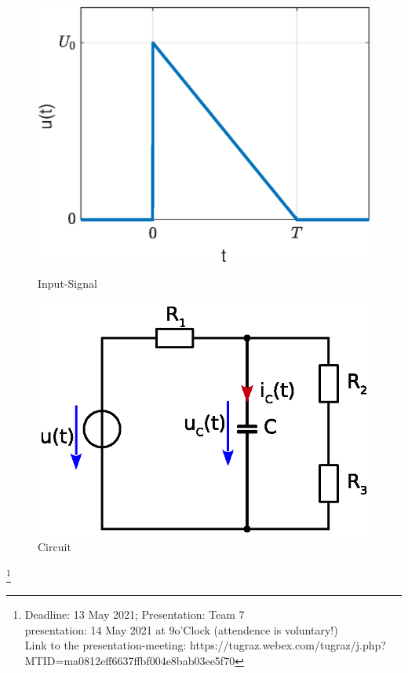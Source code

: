 \documentclass[a4paper]{article}
\newcommand\blfootnote[1]{%
	\begingroup
	\renewcommand\thefootnote{}\footnote{#1}%
	\addtocounter{footnote}{-1}%
	\endgroup
}
\begin{document}
	\begin{figure}[!htb]
		\begin{minipage}{0.4\textwidth}
			\includegraphics[width=1\textwidth]{./Figures/input-signal.eps}
			\caption{Input-Signal}
			\label{fig:input}
		\end{minipage}\hfill
		\begin{minipage}{0.4\textwidth}
			\includegraphics[width=1\textwidth]{./Figures/homework7_circuit.eps}
			\caption{Circuit}
			\label{fig:circuit}
			\vspace{1cm}
		\end{minipage}
	\end{figure}
	
	
	\blfootnote{Deadline: 13 May 2021; Presentation: Team 7 \\
		presentation: 14 May 2021 at 9o'Clock (attendence is voluntary!) \\
	Link to the presentation-meeting: https://tugraz.webex.com/tugraz/j.php?MTID=ma0812eff6637ffbf004e8bab03ee5f70}
\end{document}
